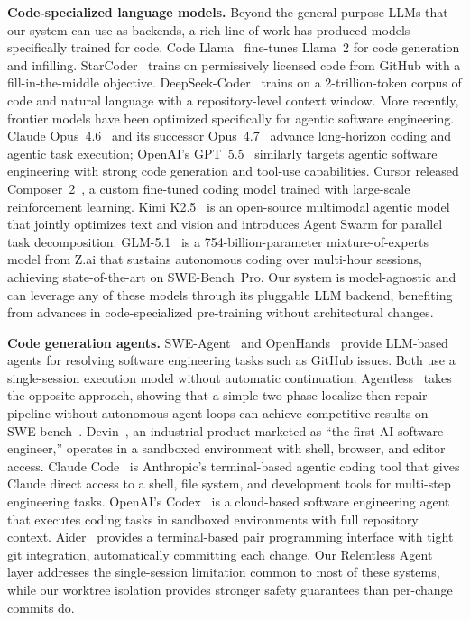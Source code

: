 \documentclass{article}
\begin{document}
\textbf{Code-specialized language models.} Beyond the general-purpose LLMs that our system can use as backends, a rich line of work has produced models specifically trained for code. Code Llama~\citep{roziere2023code} fine-tunes Llama~2 for code generation and infilling. StarCoder~\citep{li2023starcoder} trains on permissively licensed code from GitHub with a fill-in-the-middle objective. DeepSeek-Coder~\citep{guo2024deepseek} trains on a 2-trillion-token corpus of code and natural language with a repository-level context window. More recently, frontier models have been optimized specifically for agentic software engineering. Claude Opus~4.6~\citep{anthropic2026opus46} and its successor Opus~4.7~\citep{anthropic2026opus47} advance long-horizon coding and agentic task execution; OpenAI's GPT~5.5~\citep{openai2026gpt55} similarly targets agentic software engineering with strong code generation and tool-use capabilities. Cursor released Composer~2~\citep{cursor2026composer2}, a custom fine-tuned coding model trained with large-scale reinforcement learning. Kimi K2.5~\citep{kimiteam2026k25} is an open-source multimodal agentic model that jointly optimizes text and vision and introduces Agent Swarm for parallel task decomposition. GLM-5.1~\citep{zai2026glm51} is a 754-billion-parameter mixture-of-experts model from Z.ai that sustains autonomous coding over multi-hour sessions, achieving state-of-the-art on SWE-Bench~Pro. Our system is model-agnostic and can leverage any of these models through its pluggable LLM backend, benefiting from advances in code-specialized pre-training without architectural changes.

\textbf{Code generation agents.} SWE-Agent~\citep{yang2024sweagent} and OpenHands~\citep{wang2024openhands} provide LLM-based agents for resolving software engineering tasks such as GitHub issues.  Both use a single-session execution model without automatic continuation. Agentless~\citep{xia2024agentless} takes the opposite approach, showing that a simple two-phase localize-then-repair pipeline without autonomous agent loops can achieve competitive results on SWE-bench~\citep{jimenez2024swebench}.  Devin~\citep{devin2024}, an industrial product marketed as ``the first AI software engineer,'' operates in a sandboxed environment with shell, browser, and editor access.  Claude Code~\citep{claudecode2025} is Anthropic's terminal-based agentic coding tool that gives Claude direct access to a shell, file system, and development tools for multi-step engineering tasks.  OpenAI's Codex~\citep{codex2025} is a cloud-based software engineering agent that executes coding tasks in sandboxed environments with full repository context.  Aider~\citep{aider2023} provides a terminal-based pair programming interface with tight git integration, automatically committing each change.  Our Relentless Agent layer addresses the single-session limitation common to most of these systems, while our worktree isolation provides stronger safety guarantees than per-change commits do.
\end{document}
